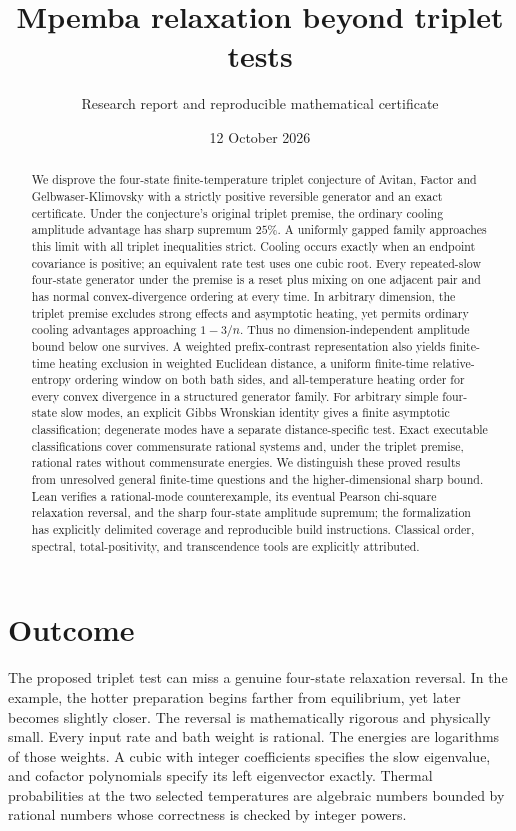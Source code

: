 \documentclass[11pt]{article}
\title{Mpemba relaxation beyond triplet tests}
\author{Research report and reproducible mathematical certificate}
\date{12 October 2026}
\begin{document}
\maketitle
\begin{abstract}
We disprove the four-state finite-temperature triplet conjecture of Avitan, Factor and Gelbwaser-Klimovsky with a strictly positive reversible generator and an exact certificate. Under the conjecture's original triplet premise, the ordinary cooling amplitude advantage has sharp supremum $25\%$. A uniformly gapped family approaches this limit with all triplet inequalities strict. Cooling occurs exactly when an endpoint covariance is positive; an equivalent rate test uses one cubic root. Every repeated-slow four-state generator under the premise is a reset plus mixing on one adjacent pair and has normal convex-divergence ordering at every time. In arbitrary dimension, the triplet premise excludes strong effects and asymptotic heating, yet permits ordinary cooling advantages approaching $1-3/n$. Thus no dimension-independent amplitude bound below one survives. A weighted prefix-contrast representation also yields finite-time heating exclusion in weighted Euclidean distance, a uniform finite-time relative-entropy ordering window on both bath sides, and all-temperature heating order for every convex divergence in a structured generator family. For arbitrary simple four-state slow modes, an explicit Gibbs Wronskian identity gives a finite asymptotic classification; degenerate modes have a separate distance-specific test. Exact executable classifications cover commensurate rational systems and, under the triplet premise, rational rates without commensurate energies. We distinguish these proved results from unresolved general finite-time questions and the higher-dimensional sharp bound. Lean verifies a rational-mode counterexample, its eventual Pearson chi-square relaxation reversal, and the sharp four-state amplitude supremum; the formalization has explicitly delimited coverage and reproducible build instructions. Classical order, spectral, total-positivity, and transcendence tools are explicitly attributed.
\end{abstract}

\section{Outcome}
The proposed triplet test can miss a genuine four-state relaxation reversal. In the example, the hotter preparation begins farther from equilibrium, yet later becomes slightly closer. The reversal is mathematically rigorous and physically small. Every input rate and bath weight is rational. The energies are logarithms of those weights. A cubic with integer coefficients specifies the slow eigenvalue, and cofactor polynomials specify its left eigenvector exactly. Thermal probabilities at the two selected temperatures are algebraic numbers bounded by rational numbers whose correctness is checked by integer powers.
\end{document}
